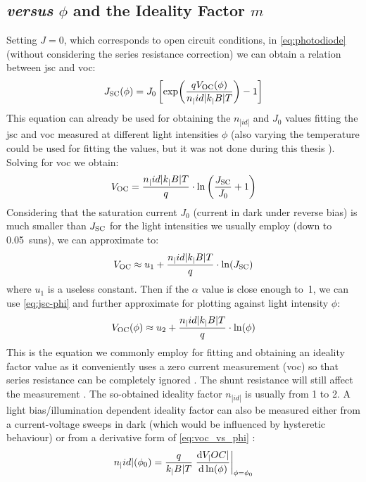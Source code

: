 	\subsection{ \textsl{versus} $\phi$ and the Ideality Factor $m$}\label{characterization_ideality}
		Setting $J=0$, which corresponds to open circuit conditions, in \cref{eq:photodiode} (without considering the series resistance correction) we can obtain a relation between \gls{jsc} and \gls{voc}:
		\begin{equation}
			J_\mathrm{SC}(\phi) = J_0\left[\exp(\frac{qV_\mathrm{OC} (\phi)}{n_|id|k_|B|T})-1\right]
		\end{equation}
		This equation can already be used for obtaining the $n_|id|$ and $J_0$ values fitting the \gls{jsc} and \gls{voc} measured at different light intensities $\phi$ (also varying the temperature could be used for fitting the values, but it was not done during this thesis \cite{Tvingstedt2016}).
		Solving for \gls{voc} we obtain:
		\begin{equation}V_\mathrm{OC} = \frac{n_|id|k_|B|T}{q}\cdot\ln\left(\frac{J_\mathrm{SC}}{J_0} + 1\right)\end{equation}
		Considering that the saturation current $J_0$ (current in dark under reverse bias) is much smaller than $J_\mathrm{SC}$ for the light intensities we usually employ (down to \SI{0.05}{suns}), we can approximate to:
		\begin{equation}
			V_\mathrm{OC} \approx u_1 + \frac{n_|id|k_|B|T}{q}\cdot\ln(J_\mathrm{SC})
		\end{equation}
		where $u_1$ is a useless constant.
		Then if the $\alpha$ value is close enough to~1, we can use \cref{eq:jsc-phi} and further approximate for plotting against light intensity $\phi$:
		\begin{equation}\label{eq:voc_vs_phi}
			V_\mathrm{OC} (\phi) \approx u_2 + \frac{n_|id|k_|B|T}{q}\cdot\ln(\phi)
		\end{equation}
		This is the equation we commonly employ for fitting and obtaining an ideality factor value \cite{Nelson2003} as it conveniently uses a zero current measurement (\gls{voc}) so that series resistance can be completely ignored \cite{Kirchartz2012}.
		The shunt resistance will still affect the measurement \cite{Tvingstedt2017}.
		The so-obtained ideality factor $n_|id|$ is usually from 1 to 2.
		A light bias/illumination dependent ideality factor can also be measured either from a current-voltage sweeps in dark (which would be influenced by hysteretic behaviour) or from a derivative form of \cref{eq:voc_vs_phi} \cite{Calado2018b}:
		\begin{equation}
			n_|id|(\phi_0) = \frac{q}{k_|B|T} \eval{\dv{V_|OC|}{\ln(\phi)}}_{\phi=\phi_0}
		\end{equation}

